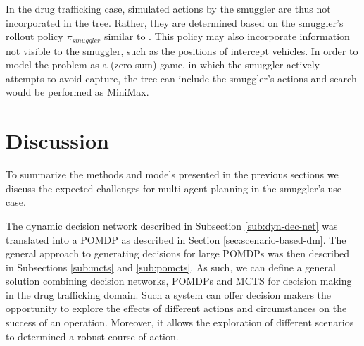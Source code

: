 \documentclass[conference]{IEEEtran}
\begin{document}
In the drug trafficking case, simulated actions by the smuggler are thus not incorporated in the tree. Rather, they are determined based on the smuggler's rollout policy $\pi_{smuggler}$ similar to \cite{realtime2014}. This policy may also incorporate information not visible to the smuggler, such as the positions of intercept vehicles. In order to model the problem as a (zero-sum) game, in which the smuggler actively attempts to avoid capture, the tree can include the smuggler's actions and search would be performed as MiniMax.

\section{Discussion}
\label{sec:discussion}

To summarize the methods and models presented in the previous sections we discuss the expected challenges for multi-agent planning in the smuggler's use case.

The dynamic decision network described in Subsection \ref{sub:dyn-dec-net} was translated into a POMDP as described in Section \ref{sec:scenario-based-dm}. The general approach to generating decisions for large POMDPs was then described in Subsections \ref{sub:mcts} and \ref{sub:pomcts}. As such, we can define a general solution combining decision networks, POMDPs and MCTS for decision making in the drug trafficking domain. Such a system can offer decision makers the opportunity to explore the effects of different actions and circumstances on the success of an operation. Moreover, it allows the exploration of different scenarios to determined a robust course of action.
\end{document}
